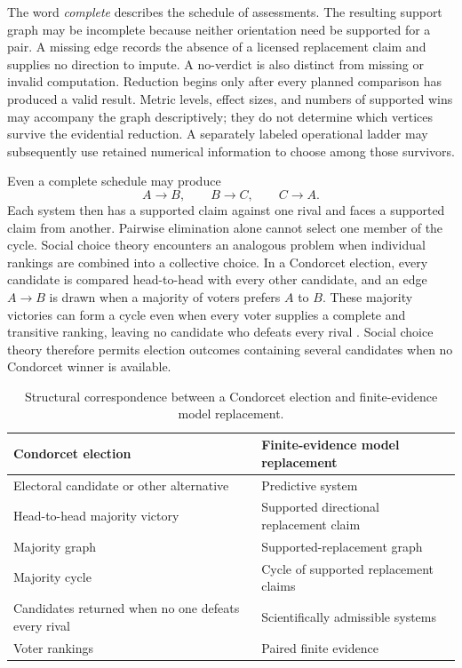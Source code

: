 \documentclass[11pt]{article}
\theoremstyle{remark}
\begin{document}
The word \emph{complete} describes the schedule of assessments. The resulting
support graph may be incomplete because neither orientation need be supported
for a pair. A missing edge records the absence of a licensed replacement
claim and supplies no direction to impute. A no-verdict is also distinct from
missing or invalid computation. Reduction begins only after every planned
comparison has produced a valid result. Metric levels, effect sizes, and
numbers of supported wins may accompany the graph descriptively; they do not
determine which vertices survive the evidential reduction. A separately
labeled operational ladder may subsequently use retained numerical information
to choose among those survivors.

Even a complete schedule may produce
\[
A\longrightarrow B,\qquad B\longrightarrow C,\qquad
C\longrightarrow A.
\]
Each system then has a supported claim against one rival and faces a supported
claim from another. Pairwise elimination alone cannot select one member of the
cycle. Social choice theory encounters an analogous problem when individual
rankings are combined into a collective choice. In a Condorcet election,
every candidate is compared head-to-head with every other candidate, and an
edge $A\to B$ is drawn when a majority of voters prefers $A$ to $B$. These
majority victories can form a cycle even when every voter supplies a complete
and transitive ranking, leaving no candidate who defeats every rival
\cite{brandt2016computational}. Social choice theory therefore permits
election outcomes containing several candidates when no Condorcet winner is
available.

\begin{table}[H]
\centering
\caption{Structural correspondence between a Condorcet election and
finite-evidence model replacement.}
\label{tab:round-robin-analogy}
\small
\begin{tabularx}{\textwidth}{@{}>{\raggedright\arraybackslash}p{}>{\raggedright\arraybackslash}X@{}}
\toprule
Condorcet election & Finite-evidence model replacement \\
\midrule
Electoral candidate or other alternative & Predictive system \\
Head-to-head majority victory & Supported directional replacement claim \\
Majority graph & Supported-replacement graph \\
Majority cycle & Cycle of supported replacement claims \\
Candidates returned when no one defeats every rival & Scientifically admissible systems \\
Voter rankings & Paired finite evidence \\
\bottomrule
\end{tabularx}
\end{table}
\end{document}
